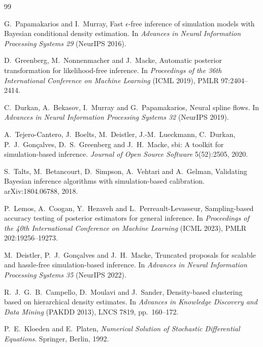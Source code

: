 \documentclass[10pt,a4paper]{article}
\begin{document}
\begin{thebibliography}{99}

G.~Papamakarios and I.~Murray,
\newblock Fast $\epsilon$-free inference of simulation models with Bayesian conditional density estimation.
\newblock In \emph{Advances in Neural Information Processing Systems 29} (NeurIPS 2016).

D.~Greenberg, M.~Nonnenmacher and J.~Macke,
\newblock Automatic posterior transformation for likelihood-free inference.
\newblock In \emph{Proceedings of the 36th International Conference on Machine Learning} (ICML 2019),
  PMLR 97:2404--2414.

C.~Durkan, A.~Bekasov, I.~Murray and G.~Papamakarios,
\newblock Neural spline flows.
\newblock In \emph{Advances in Neural Information Processing Systems 32} (NeurIPS 2019).

A.~Tejero-Cantero, J.~Boelts, M.~Deistler, J.-M.~Lueckmann, C.~Durkan, P.~J.~Gon{\c c}alves, D.~S.~Greenberg and
  J.~H.~Macke,
\newblock sbi: A toolkit for simulation-based inference.
\newblock \emph{Journal of Open Source Software} 5(52):2505, 2020.

S.~Talts, M.~Betancourt, D.~Simpson, A.~Vehtari and A.~Gelman,
\newblock Validating Bayesian inference algorithms with simulation-based calibration.
\newblock arXiv:1804.06788, 2018.

P.~Lemos, A.~Coogan, Y.~Hezaveh and L.~Perreault-Levasseur,
\newblock Sampling-based accuracy testing of posterior estimators for general inference.
\newblock In \emph{Proceedings of the 40th International Conference on Machine Learning} (ICML 2023),
  PMLR 202:19256--19273.

M.~Deistler, P.~J.~Gon{\c c}alves and J.~H.~Macke,
\newblock Truncated proposals for scalable and hassle-free simulation-based inference.
\newblock In \emph{Advances in Neural Information Processing Systems 35} (NeurIPS 2022).

R.~J.~G.~B.~Campello, D.~Moulavi and J.~Sander,
\newblock Density-based clustering based on hierarchical density estimates.
\newblock In \emph{Advances in Knowledge Discovery and Data Mining} (PAKDD 2013), LNCS 7819, pp.~160--172.

P.~E.~Kloeden and E.~Platen,
\newblock \emph{Numerical Solution of Stochastic Differential Equations}.
\newblock Springer, Berlin, 1992.

\end{thebibliography}
\end{document}
